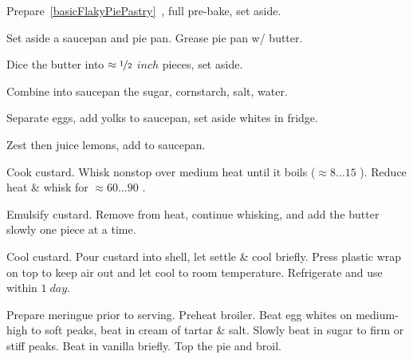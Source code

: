 \begin{preparation}
\item Prepare~\ref{basicFlakyPiePastry}~, full pre-bake, set aside.

\item Set aside a saucepan and pie pan.
	Grease pie pan w/ butter.

\item Dice the butter into $\approx\nicefrac{1}{2}$ $inch$ pieces, set aside.

\item Combine into saucepan the sugar, cornstarch, salt, water.

\item Separate eggs, add yolks to saucepan, set aside whites in fridge.

\item Zest then juice lemons, add to saucepan.

\item Cook custard.
	Whisk nonstop over medium heat until it boils ($\approx 8\dots15$ \minute).
	Reduce heat \& whisk for $\approx 60 \dots 90$ \second.

\item Emulsify custard.
	Remove from heat, continue whisking, and add the butter slowly one piece at a time.

\item Cool custard.
	Pour custard into shell, let settle \& cool briefly.
	Press plastic wrap on top to keep air out and let cool to room temperature.
	Refrigerate and use within $1\; day$.

\item Prepare meringue prior to serving.
	Preheat broiler.
	Beat egg whites on medium-high to soft peaks, beat in cream of tartar \& salt.
	Slowly beat in sugar to firm or stiff peaks.
	Beat in vanilla briefly. Top the pie and broil.
\end{preparation}


\recipeend%
